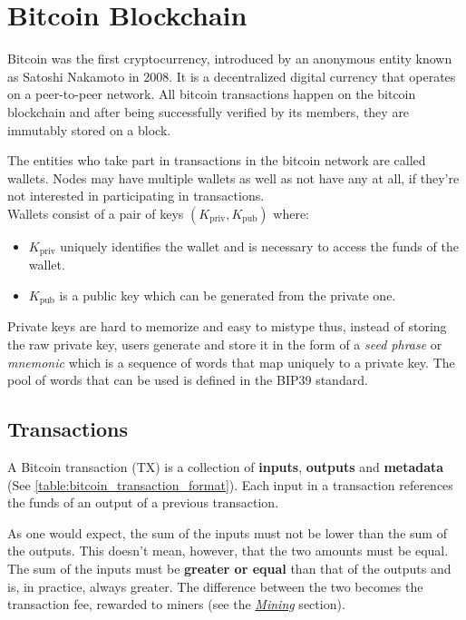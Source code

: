 \section{Bitcoin Blockchain}\label{sec:bitcoin}
Bitcoin was the first cryptocurrency, introduced by an anonymous entity known as Satoshi Nakamoto in 2008.
It is a decentralized digital currency that operates on a peer-to-peer network.
All bitcoin transactions happen on the bitcoin blockchain and after being successfully verified by its
members, they are immutably stored on a block. \cite{BitcoinWhitePaper}

The entities who take part in transactions in the bitcoin network are called wallets.
Nodes may have multiple wallets as well as not have any at all, if they're not interested in participating in
transactions.
\\
Wallets consist of a pair of keys $(K_{\text{priv}}, K_{\text{pub}})$ where:
\begin{itemize}
  \item $K_{\text{priv}}$ uniquely identifies the wallet and is necessary to access the funds of the wallet.
  \item $K_{\text{pub}}$ is a public key which can be generated from the private one.
\end{itemize}

Private keys are hard to memorize and easy to mistype thus, instead of storing the raw private key, users
generate and store it in the form of
a \textit{seed phrase} or \textit{mnemonic} which is a sequence of words that map uniquely to a private key.
The pool of words that can be used is defined in the BIP39 standard.

\subsection{Transactions}
A Bitcoin transaction (TX) is a collection of \textbf{inputs}, \textbf{outputs} and \textbf{metadata} (See
\ref{table:bitcoin_transaction_format}).
Each input in a transaction references the funds of an output of a previous transaction.

As one would expect, the sum of the inputs must not be lower than the sum of the outputs.
This doesn't mean, however, that the two amounts must be equal.
The sum of the inputs must be \textbf{greater or equal} than that of the outputs and is, in practice, always greater.
The difference between the two becomes the transaction fee, rewarded to miners (see the
\hyperref[sec:mining]{\textit{Mining}} section).

